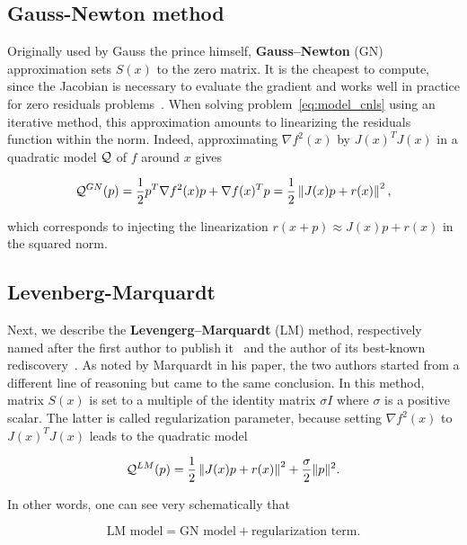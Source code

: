 \documentclass[10pt]{article}
\numberwithin{equation}{section}
\begin{document}
	 \subsection{Gauss-Newton method}
	 
	 Originally used by Gauss the prince himself, \textbf{Gauss--Newton} (GN) approximation sets $S(x)$ to the zero matrix. It is the cheapest to compute, since the Jacobian is necessary to evaluate the gradient and works well in practice for zero residuals problems~\cite{dennisschnabel:1996}. When solving problem~\eqref{eq:model_cnls} using an iterative method, this approximation amounts to linearizing the residuals function within the norm. Indeed, approximating $\nabla f^2(x)$ by $J(x)^TJ(x)$ in a quadratic model ${\mathcal{Q}}$ of $f$ around $x$ gives
	 
	 \begin{equation}\label{eq:gn_model}
	 	{\mathcal{Q}}^{GN} (p) = \dfrac{1}{2}p^T\nabla f^2(x)p + \nabla f(x)^Tp =  \dfrac{1}{2} \left\Vert J(x)p+r(x) \right\Vert^2,
	 \end{equation}
	 
	 which corresponds to injecting the linearization $r(x+p) \approx J(x)p+r(x)$ in the squared norm.
	 
	 \subsection{Levenberg-Marquardt}
	 
	 Next, we describe the \textbf{Levengerg--Marquardt} (LM) method, respectively named after the first author to publish it~\cite{levenberg:1944} and the author of its best-known rediscovery~\cite{marquardt:1963}. As noted by Marquardt in his paper, the two authors started from a different line of reasoning but came to the same conclusion. In this method, matrix $S(x)$ is set to a multiple of the identity matrix $\sigma I$ where $\sigma$ is a positive scalar. The latter is called regularization parameter, because setting  $\nabla f^2(x)$ to $J(x)^TJ(x)$ leads to the quadratic model 
	 
	 \begin{equation}\label{eq:lm_model}
	 	{\mathcal{Q}}^{LM}(p) =  \dfrac{1}{2} \left\Vert J(x)p+r(x) \right\Vert^2 + \dfrac{\sigma}{2} \|p\|^2.
	 \end{equation}
	 
	 In other words, one can see very schematically that
	 
	\[\text{LM model} = \text{GN model} + \text{regularization term}.\]
	
\end{document}
